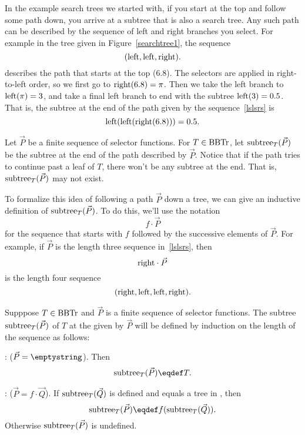 In the example search trees we started with, if you start at the top
and follow some path down, you arrive at a subtree that is also a
search tree.  Any such path can be described by the sequence of left
and right branches you select.  For example in the tree given in
Figure~\ref{searchtree1}, the sequence
\begin{equation}\label{lslsrs}
(\text{left},\text{left},\text{right}).
\end{equation}
describes the path that starts at the top (6.8).  The selectors are
applied in right-to-left order, so we first go to $\text{right}(6.8) =
\pi$.  Then we take the left branch to $\text{left}(\pi) = 3$, and take a
final left branch to end with the subtree $\text{left}(3) = 0.5$.  That
is, the subtree at the end of the path given by the sequence~\eqref{lslsrs} is
\[
\text{left}(\text{left}(\text{right}(6.8))) = 0.5.
\]

Let $\vec{P}$ be a finite sequence of selector functions.  For $T \in
\text{BBTr}$, let $\text{subtree}_{T}(\vec{P})$ be the subtree at the end of the
path described by $\vec{P}$.  Notice that if the path tries to
continue past a leaf of $T$, there won't be any subtree at the end.
That is, $\text{subtree}_{T}(\vec{P})$ may not exist.

To formalize this idea of following a path $\vec{P}$ down a tree, we
can give an inductive definition of $\text{subtree}_{T}(\vec{P})$.  To do
this, we'll use the notation
\[
f \cdot \vec{P}
\]
for the sequence that starts with $f$ followed by the successive
elements of $\vec{P}$.  For example, if $\vec{P}$ is the length three
sequence in~\eqref{lslsrs}, then
\[
\text{right} \cdot \vec{P}
\]
is the length four sequence
\[
(\text{right}, \text{left},\text{left},\text{right}).
\]

\begin{definition}
Supppose $T \in \text{BBTr}$ and $\vec{P}$ is a finite sequence of selector
functions.  The subtree $\text{subtree}_{T}(\vec{P} )$ of $T$ at the  given by $\vec{P}$ will be defined by induction on
the length of the sequence as follows:

: ($\vec{P} = \emptystring$).
Then
\[
\rslt{T}{(\vec{P})} \eqdef T.
\]

: ($\vec{P} = f \cdot \vec{Q}$).  If
$\text{subtree}_{T}(\vec{Q})$ is defined and equals a tree in \brnchng, then
\[
\rslt{T}{(\vec{P})} \eqdef f(\rslt{T}{(\vec{Q})}).
\]
Otherwise $\text{subtree}_{T}(\vec{P})$ is undefined.
\end{definition}

